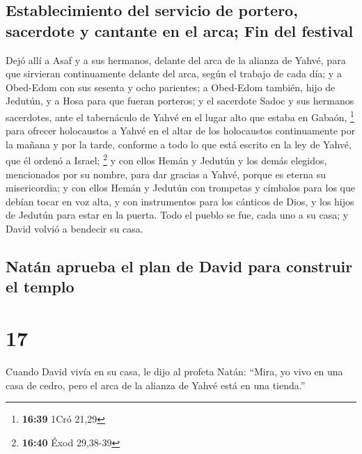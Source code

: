 \hypertarget{establecimiento-del-servicio-de-portero-sacerdote-y-cantante-en-el-arca-fin-del-festival}{%
\subsection{Establecimiento del servicio de portero, sacerdote y
cantante en el arca; Fin del
festival}\label{establecimiento-del-servicio-de-portero-sacerdote-y-cantante-en-el-arca-fin-del-festival}}

 Dejó allí a Asaf y a sus hermanos, delante del arca de
la alianza de Yahvé, para que sirvieran continuamente delante del arca,
según el trabajo de cada día;  y a Obed-Edom con sus
sesenta y ocho parientes; a Obed-Edom también, hijo de Jedutún, y a Hosa
para que fueran porteros;  y el sacerdote Sadoc y sus
hermanos sacerdotes, ante el tabernáculo de Yahvé en el lugar alto que
estaba en Gabaón, \footnote{\textbf{16:39} 1Cró 21,29} 
para ofrecer holocaustos a Yahvé en el altar de los holocaustos
continuamente por la mañana y por la tarde, conforme a todo lo que está
escrito en la ley de Yahvé, que él ordenó a Israel; \footnote{\textbf{16:40}
  Éxod 29,38-39}  y con ellos Hemán y Jedutún y los demás
elegidos, mencionados por su nombre, para dar gracias a Yahvé, porque es
eterna su misericordia;  y con ellos Hemán y Jedutún con
trompetas y címbalos para los que debían tocar en voz alta, y con
instrumentos para los cánticos de Dios, y los hijos de Jedutún para
estar en la puerta.  Todo el pueblo se fue, cada uno a su
casa; y David volvió a bendecir su casa.

\hypertarget{natuxe1n-aprueba-el-plan-de-david-para-construir-el-templo}{%
\subsection{Natán aprueba el plan de David para construir el
templo}\label{natuxe1n-aprueba-el-plan-de-david-para-construir-el-templo}}

\hypertarget{section-16}{%
\section{17}\label{section-16}}

 Cuando David vivía en su casa, le dijo al profeta Natán:
``Mira, yo vivo en una casa de cedro, pero el arca de la alianza de
Yahvé está en una tienda.''

